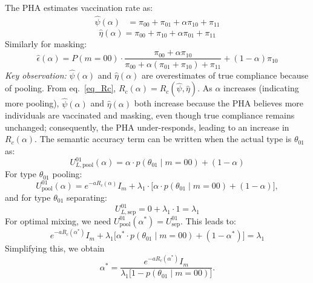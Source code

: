 \documentclass[sigconf,review]{acmart}
\begin{document}
The PHA estimates vaccination rate as:
\begin{equation}
\begin{aligned}
\hat{\psi}(\alpha) &= \pi_{00} + \pi_{01} + \alpha\pi_{10}+ \pi_{11}
\end{aligned}
\end{equation}
\begin{equation}
\hat{\eta}(\alpha) = \pi_{00} + \pi_{10} + \alpha\pi_{01}+ \pi_{11}
\end{equation}
Similarly for masking:
\begin{equation}
\hat{\epsilon}(\alpha) = P(m = 00) \cdot \frac{\pi_{00} + \alpha \pi_{10}}{\pi_{00} + \alpha(\pi_{01} + \pi_{10}) + \pi_{11}} + (1 - \alpha)\pi_{10}
\end{equation}
\textit{Key observation:} $\hat{\psi}(\alpha)$ and $\hat{\eta}(\alpha)$ are overestimates of true compliance because of pooling. From eq.~\eqref{eq_Rc}, $R_c(\alpha) = R_c(\hat{\psi},\hat{\eta})$. As $\alpha$ increases (indicating more pooling), $\hat{\psi}(\alpha)$ and $\hat{\eta}(\alpha)$ both increase because the PHA believes more individuals are vaccinated and masking, even though true compliance remains unchanged; consequently, the PHA under-responds, leading to an increase in $R_c(\alpha)$. The semantic accuracy term can be written when the actual type is $\theta_{01}$ as:
\begin{equation}
U_{L,\text{pool}}^{01}(\alpha) = \alpha \cdot p(\theta_{01} \mid m = 00) + (1 - \alpha)
\end{equation}
For type $\theta_{01}$ pooling:
\begin{equation}
U^{01}_{\text{pool}}(\alpha) = e^{-a R_c(\alpha)} I_m + \lambda_1 \cdot \big[ \alpha \cdot p(\theta_{01} \mid m = 00) + (1 - \alpha) \big],
\end{equation}
and for type $\theta_{01}$ separating:
\begin{equation}
U^{01}_{L,\text{sep}} = 0 + \lambda_1 \cdot 1 = \lambda_1
\end{equation}
For optimal mixing,
we need
$U^{01}_{\text{pool}}(\alpha^*) = U^{01}_{\text{sep}}. $ This leads to:
\begin{equation}
e^{-a R_c(\alpha^*)} I_m + \lambda_1 \big[ \alpha^* \cdot p(\theta_{01} \mid m = 00) + (1 - \alpha^*) \big] = \lambda_1
\end{equation}
Simplifying this, we obtain
\begin{equation}
\alpha^* = \frac{e^{-a R_c(\alpha^*)} I_m}{\lambda_1 \big[ 1 - p(\theta_{01} \mid m = 00) \big]}.
\end{equation}
\end{document}
